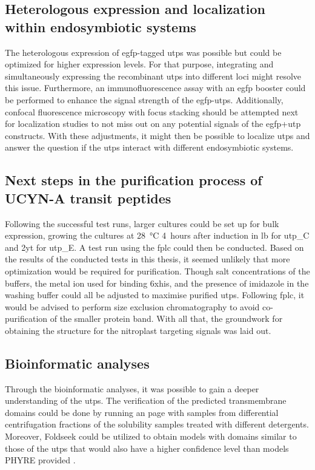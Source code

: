 \subsection{Heterologous expression and localization within endosymbiotic systems}
The heterologous expression of \gls{egfp}-tagged \gls{utp}s was possible but could be optimized for higher expression levels. For that purpose, integrating and simultaneously expressing the recombinant \gls{utp}s into different loci might resolve this issue. Furthermore, an immunofluorescence assay with an \gls{egfp} booster could be performed to enhance the signal strength of the \gls{egfp}-\gls{utp}s. Additionally, confocal fluorescence microscopy with focus stacking should be attempted next for localization studies to not miss out on any potential signals of the \gls{egfp}+\gls{utp} constructs. With these adjustments, it might then be possible to localize \gls{utp}s and answer the question if the \gls{utp}s interact with different endosymbiotic systems.
\subsection{Next steps in the purification process of UCYN-A transit peptides}
Following the successful test runs, larger cultures could be set up for bulk expression, growing the cultures at 28~°C 4~hours after induction in \gls{lb} for \gls{utp_C} and \gls{2yt} for \gls{utp_E}. A test run using the \gls{fplc} could then be conducted. Based on the results of the conducted tests in this thesis, it seemed unlikely that more optimization would be required for purification. Though salt concentrations of the buffers, the metal ion used for binding \gls{6xhis}, and the presence of imidazole in the washing buffer could all be adjusted to maximise purified \gls{utp}s. Following \gls{fplc}, it would be advised to perform size exclusion chromatography to avoid co-purification of the smaller protein band. With all that, the groundwork for obtaining the structure for the nitroplast targeting signals was laid out.
\subsection{Bioinformatic analyses}
Through the bioinformatic analyses, it was possible to gain a deeper understanding of the \gls{utp}s. The verification of the predicted transmembrane domains could be done by running an \gls{page} with samples from differential centrifugation fractions of the  solubility samples treated with different detergents. Moreover, Foldseek could be utilized to obtain models with domains similar to those of the \gls{utp}s that would also have a higher confidence level than models PHYRE provided \parencite{van_kempen_fast_2024}.

